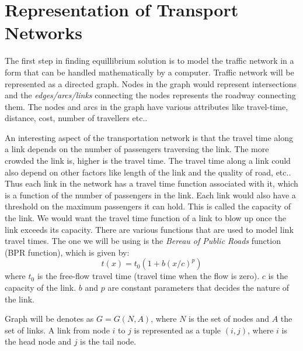 \section{Representation of Transport Networks}
	The first step in finding equillibrium solution is to
	model the traffic network in a form that can be handled
	mathematically by a computer.
	Traffic network will be represented as a directed graph.
	Nodes in the graph would represent intersections and
	the \emph{edges/arcs/links} connecting the nodes represents
	the roadway connecting them.
	The nodes and arcs in the graph have various attributes
	like travel-time, distance, cost, number of travellers etc..

	An interesting aspect of the transportation network is that
	the travel time along a link depends on the number of
	passengers traversing the link. The more crowded the link
	is, higher is the travel time. The travel time along a
	link could also depend on other factors like length of
	the link and the quality of road, etc.. Thus each link
	in the network has a travel time function associated
	with it, which is a function of the number of passengers in the
	link. Each link would also have a threshold on the maximum
	passengers it can hold. This is called the capacity of the
	link. We would want the travel time function of a link
	to blow up once the link exceeds its capacity. There are
	various functions that are used to model link travel times.
	The one we will be using is the \emph{Bereau of Public Roads}
	function (BPR function), which is given by:
	\[
		t(x) = t_0(1 + b(x/c)^{p})
	\]
	where $t_0$ is the free-flow travel time (travel time when
	the flow is zero). $c$ is the capacity of the link. $b$ and $p$
	are constant parameters that decides the nature of the link.

	Graph will be denotes as $G= G(N,A)$, where $N$ is the
	set of nodes and $A$ the set of links.
	A link from node $i$ to $j$ is represented as a
	tuple $(i,j)$, where $i$ is the head node and
	$j$ is the tail node.
